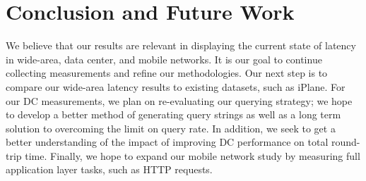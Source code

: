 
\section{Conclusion and Future Work}
\label{sec:conclusion}

We believe that our results are relevant in displaying the current state of latency in wide-area, data center, and mobile networks. It is our goal to continue collecting measurements and refine our methodologies. Our next step is to compare our wide-area latency results to existing datasets, such as iPlane. For our DC measurements, we plan on re-evaluating our querying strategy; we hope to develop a better method of generating query strings as well as a long term solution to overcoming the limit on query rate. In addition, we seek to get a better understanding of the impact of improving DC performance on total round-trip time. Finally, we hope to expand our mobile network study by measuring full application layer tasks, such as HTTP requests.

